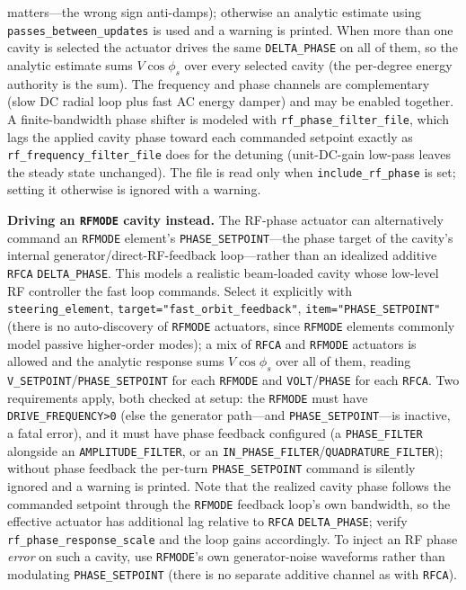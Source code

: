 \documentclass[11pt]{article}
\begin{document}
matters---the wrong sign anti-damps); otherwise an analytic estimate using
\verb|passes_between_updates| is used and a warning is printed.  When more than one cavity is
selected the actuator drives the same \verb|DELTA_PHASE| on all of them, so the analytic estimate
sums $V\cos\phi_s$ over every selected cavity (the per-degree energy authority is the sum).  The
frequency and phase
channels are complementary (slow DC radial loop plus fast AC energy damper) and may be
enabled together.  A finite-bandwidth phase shifter is modeled with
\verb|rf_phase_filter_file|, which lags the applied cavity phase toward each commanded
setpoint exactly as \verb|rf_frequency_filter_file| does for the detuning (unit-DC-gain
low-pass leaves the steady state unchanged).  The file is read only when
\verb|include_rf_phase| is set; setting it otherwise is ignored with a warning.

\textbf{Driving an \texttt{RFMODE} cavity instead.}  The RF-phase actuator can alternatively
command an \verb|RFMODE| element's \verb|PHASE_SETPOINT|---the phase target of the cavity's
internal generator/direct-RF-feedback loop---rather than an idealized additive \verb|RFCA|
\verb|DELTA_PHASE|.  This models a realistic beam-loaded cavity whose low-level RF controller the
fast loop commands.  Select it explicitly with \verb|steering_element|, \verb|target="fast_orbit_feedback"|,
\verb|item="PHASE_SETPOINT"| (there is no auto-discovery of \verb|RFMODE| actuators, since
\verb|RFMODE| elements commonly model passive higher-order modes); a mix of \verb|RFCA| and
\verb|RFMODE| actuators is allowed and the analytic response sums $V\cos\phi_s$ over all of them,
reading \verb|V_SETPOINT|/\verb|PHASE_SETPOINT| for each \verb|RFMODE| and \verb|VOLT|/\verb|PHASE|
for each \verb|RFCA|.  Two requirements apply, both checked at setup: the \verb|RFMODE| must have
\verb|DRIVE_FREQUENCY>0| (else the generator path---and \verb|PHASE_SETPOINT|---is inactive, a
fatal error), and it must have phase feedback configured (a \verb|PHASE_FILTER| alongside an
\verb|AMPLITUDE_FILTER|, or an \verb|IN_PHASE_FILTER|/\verb|QUADRATURE_FILTER|); without phase
feedback the per-turn \verb|PHASE_SETPOINT| command is silently ignored and a warning is printed.
Note that the realized cavity phase follows the commanded setpoint through the \verb|RFMODE|
feedback loop's own bandwidth, so the effective actuator has additional lag relative to \verb|RFCA|
\verb|DELTA_PHASE|; verify \verb|rf_phase_response_scale| and the loop gains accordingly.  To inject
an RF phase \emph{error} on such a cavity, use \verb|RFMODE|'s own generator-noise waveforms rather
than modulating \verb|PHASE_SETPOINT| (there is no separate additive channel as with \verb|RFCA|).
\end{document}
